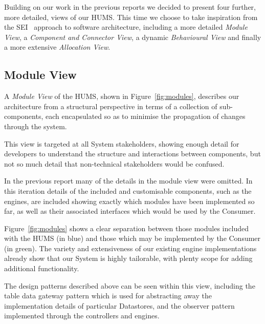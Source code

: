 \documentclass[10pt,a4paper]{article}
\begin{document}
Building on our work in the previous reports we decided to present four further, more detailed, views of our HUMS. This time we choose to take inspiration from the SEI~\cite{Bass98} approach to software architecture, including a more detailed \emph{Module View}, a \emph{Component and Connector View}, a dynamic \emph{Behavioural View} and finally a more extensive \emph{Allocation View}.

\subsection{Module View}
\label{sec:views}
A \emph{Module View} of the HUMS, shown in Figure~\ref{fig:modules}, describes our architecture from a structural perspective in terms of a collection of sub-components, each encapsulated so as to minimise the propagation of changes through the system. %

This view is targeted at all System stakeholders, showing enough detail for developers to understand the structure and interactions between components, but not so much detail that non-technical stakeholders would be confused.

In the previous report many of the details in the module view were omitted. In this iteration details of the included and customisable components, such as the engines, are included showing exactly which modules have been implemented so far, as well as their associated interfaces which would be used by the Consumer. 

Figure~\ref{fig:modules} shows a clear separation between those modules included with the HUMS (in blue) and those which may be implemented by the Consumer (in green). The variety and extensiveness of our existing engine implementations already show that our System is highly tailorable, with plenty scope for adding additional functionality.

The design patterns described above can be seen within this view, including the table data gateway pattern which is used for abstracting away the implementation details of particular Datastores, and the observer pattern implemented through the controllers and engines.
\end{document}
